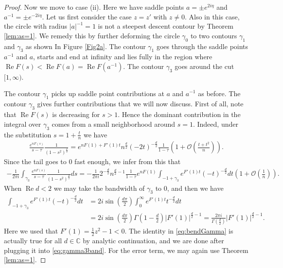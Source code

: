 \documentclass[%
 jmp,
cp,  %
 amsmath,amsthm,amssymb,%
 reprint,%
onecolumn]{revtex4-2}
\renewcommand{\Re}{\operatorname{Re}}
\begin{document}
\begin{proof}
Now we move to case (ii). Here we have saddle points $a = \pm e^{2i\eta}$ and $a^{-1} = \pm e^{-2i\eta}$. Let us first consider the case $z=z'$ with $z\neq 0$. Also in this case, the circle with radius $|a|^{-1}=1$ is not a steepest descent contour by Theorem \ref{lem:as=1}. We remedy this by further  deforming the  circle $\gamma_0$ to two  contours $\gamma_1$ and $\gamma_3$ as shown In Figure \ref{Fig2a}. The contour $\gamma_1$ goes through the saddle points $a^{-1}$ and $a$,  starts and end at infinity and lies fully in the region where $\Re F(s) < \Re F(a)=\Re F(a^{-1})$. The contour $\gamma_3$ goes around the cut $[1,\infty)$. 

The contour $\gamma_1$ picks up saddle point contributions at $a$ and $a^{-1}$ as before.  The contour $\gamma_3$ gives further contributions that we will now discuss. First of all, note that $\Re F(s)$ is dscreasing for $s>1$. Hence the dominant contribution in the integral over $\gamma_3$ comes from a small neighborhood around $s=1$.  Indeed, under the substitution $s = 1+\frac{t}{n}$ we have
\begin{align*}
\frac{e^{n F(s)}}{s-\tau}\frac{1}{(1-s^2)^\frac{d}{2}} 
= e^{n F(1)+ F'(1) t} n^\frac{d}{2} (-2 t)^{-\frac{d}{2}} \frac{1}{1-\tau} \left(1+\mathcal O\left(\frac{t+t^2}{n}\right)\right).
\end{align*}
Since the tail goes to $0$ fast enough, we infer from this that
\begin{align} \label{eq:gamma3band}
-\frac{1}{2\pi i} \int_{\gamma_3} \frac{e^{n F(s)}}{s-\tau} \frac{1}{(1-s^2)^\frac{d}{2}} ds 
= -\frac{1}{2\pi i} 2^{-\frac{d}{2}} n^{\frac{d}{2}-1} \frac{1}{1-\tau} e^{n F(1)} \int_{-1+\gamma_3} e^{F'(1) t} (-t)^{-\frac{d}{2}} dt \left(1+\mathcal O\left(\frac{1}{n}\right)\right).
\end{align}
When $\operatorname{Re} d<2$ we may take the bandwidth of $\gamma_3$ to $0$, and then we have
\begin{align} \nonumber
\int_{-1+\gamma_3} e^{F'(1) t} (-t)^{-\frac{d}{2}} dt
&= 2i\sin\left(\frac{d \pi}{2}\right) \int_0^\infty e^{F'(1) t} t^{-\frac{d}{2}} dt\\ \label{eq:bendGamma}
&= 2i\sin\left(\frac{d \pi}{2}\right) \Gamma\left(1-\frac{d}{2}\right) |F'(1)|^{\frac{d}{2}-1}
= \frac{2\pi i}{\Gamma\left(\frac{d}{2}\right)} |F'(1)|^{\frac{d}{2}-1}.
\end{align}
Here we used that $F'(1) = \frac{1}{2} z^2 - 1<0$. The identity in \eqref{eq:bendGamma} is actually true for all $d\in\mathbb C$ by analytic continuation, and we are done after plugging it into \eqref{eq:gamma3band}. For the error term, we may again use Theorem \ref{lem:as=1}. 


\end{proof}
\end{document}
